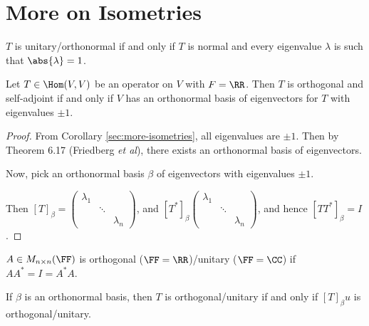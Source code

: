 \documentclass[11pt]{scrartcl}
\begin{document}
\section{More on Isometries}
\begin{corollary}
  \label{sec:more-isometries}
  $T$ is unitary/orthonormal if and only if $T$ is normal and every eigenvalue $\lambda$ is such that $\abs{\lambda}=1$.
\end{corollary}
\begin{theorem}
  Let $T \in \Hom(V,V)$ be an operator on $V$ with $F = \RR$. Then $T$ is orthogonal and self-adjoint if and only if $V$ has an orthonormal basis of eigenvectors for $T$ with eigenvalues $\pm 1$. 
\end{theorem}
\begin{proof}
  \hfill
  From Corollary \ref{sec:more-isometries}, all eigenvalues are $\pm 1$. Then by Theorem 6.17 (Friedberg \textit{et al}), there exists an orthonormal basis of eigenvectors.

  Now, pick an orthonormal basis $\beta$ of eigenvectors with eigenvalues $\pm 1$.

  Then $[T]_{\beta} = 
  \begin{pmatrix}
    \lambda_1 &        & \\
              & \ddots & \\
              &        & \lambda_n
            \end{pmatrix}$, and
  $[T^{*}]_{\beta}\begin{pmatrix}
    \lambda_1 &        & \\
              & \ddots & \\
              &        & \lambda_n
            \end{pmatrix}$, and hence
            $[TT^{*}]_{\beta} = I$.
          \end{proof}

          \begin{definition}
            $A \in M_{n\times n}(\FF)$ is orthogonal ($\FF = \RR$)/unitary ($\FF=\CC$) if $AA^{*}=I = A^{*}A$.
          \end{definition}

\begin{remark}
    If $\beta$ is an orthonormal basis, then $T$ is orthogonal/unitary if and only if $[T]_{\beta}u$ is orthogonal/unitary.
  \end{remark}
\end{document}
